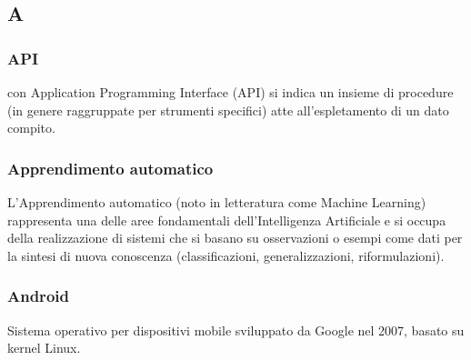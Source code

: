 \subsection*{\textbf{\hfill \Huge{A} \hfill}} 

\subsubsection*{API}
con Application Programming Interface (API) si indica un insieme di procedure (in genere raggruppate per strumenti specifici) atte all'espletamento di un dato compito.

\subsubsection*{Apprendimento automatico}
L'Apprendimento automatico (noto in letteratura come Machine Learning) rappresenta una delle aree fondamentali dell'Intelligenza Artificiale e si occupa della realizzazione di sistemi che si basano su osservazioni o esempi come dati per la sintesi di nuova conoscenza (classificazioni, generalizzazioni, riformulazioni).


\subsubsection*{Android}
Sistema operativo per dispositivi mobile sviluppato da Google nel 2007, basato su kernel Linux.
